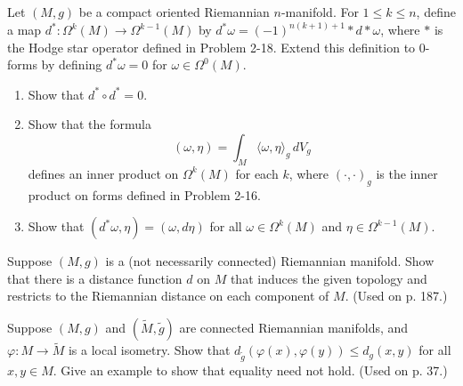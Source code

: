 \begin{exercise}
\label{prob:codifferential-operator}
Let $(M,g)$ be a compact oriented Riemannian $n$-manifold. For $1 \leq k \leq n$, define a map $d^* : \Omega^k(M) \to \Omega^{k-1}(M)$ by $d^* \omega = (-1)^{n(k+1)+1} * d * \omega$, where $*$ is the Hodge star operator defined in Problem 2-18. Extend this definition to 0-forms by defining $d^*\omega = 0$ for $\omega \in \Omega^0(M)$.

\begin{enumerate}
\item[(a)] Show that $d^* \circ d^* = 0$.
\item[(b)] Show that the formula
\[
(\omega, \eta) = \int_M \langle \omega, \eta \rangle_g \, dV_g
\]
defines an inner product on $\Omega^k(M)$ for each $k$, where $(\cdot, \cdot)_g$ is the inner product on forms defined in Problem 2-16.
\item[(c)] Show that $(d^*\omega, \eta) = (\omega, d\eta)$ for all $\omega \in \Omega^k(M)$ and $\eta \in \Omega^{k-1}(M)$.
\end{enumerate}
\end{exercise}

\begin{exercise}\label{prob:distance-disconnected-riemannian}
Suppose $(M,g)$ is a (not necessarily connected) Riemannian manifold. Show that there is a distance function $d$ on $M$ that induces the given topology and restricts to the Riemannian distance on each component of $M$. (Used on p. 187.)
\end{exercise}

\begin{exercise}\label{prob:local-isometry-distance}
Suppose $(M,g)$ and $(\tilde{M}, \tilde{g})$ are connected Riemannian manifolds, and $\varphi: M \to \tilde{M}$ is a local isometry. Show that $d_{\tilde{g}}(\varphi(x), \varphi(y)) \leq d_g(x,y)$ for all $x, y \in M$. Give an example to show that equality need not hold. (Used on p. 37.)
\end{exercise}

